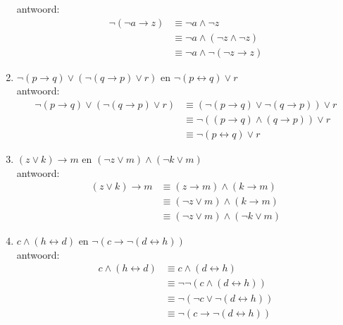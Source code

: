\begin{answer}
\begin{enumerate}[label=\textit{\alph*.}]
antwoord:
\begin{align}
\neg (\neg a\rightarrow z) &\equiv \neg a\wedge \neg z \tag{St-2.3.2: 8} \\
&\equiv \neg a\wedge (\neg z \wedge \neg z) \tag{St-2.3.2: 1}\\
&\equiv \neg a\wedge \neg (\neg z\rightarrow z) \tag{St-2.3.2: 8}
\end{align}
\item $\neg(p\rightarrow q) \lor (\neg (q \rightarrow p) \lor r)$ en $\neg (p\leftrightarrow q) \lor r$\\
antwoord:
\begin{align}
\neg (p \rightarrow q)\vee (\neg (q\rightarrow p)\vee r) &\equiv (\neg (p \rightarrow q)\vee \neg (q\rightarrow p))\vee r \tag{St-2.3.2: 5} \\
&\equiv \neg ((p\rightarrow q) \land (q\rightarrow p)) \vee r \tag{St-2.3.2:10}\\
&\equiv \neg (p \leftrightarrow q) \vee r \tag{St-2.3.2: 4}
\end{align}
\item $(z\lor k)\rightarrow m$ en $(\neg z \lor m) \land (\neg k \lor m)$\\
antwoord:
\begin{align}
(z\vee k)\rightarrow m &\equiv (z\rightarrow m)\wedge (k\rightarrow m) \tag{St-2.3.2:13} \\
&\equiv (\neg z\vee m)\wedge (k\rightarrow m) \tag{St-2.3.2: 7}\\
&\equiv (\neg z\vee m)\wedge (\neg k\vee m) \tag{St-2.3.2: 7}
\end{align}
\item $c \land (h\leftrightarrow d)$ en $\neg (c \rightarrow \neg (d \leftrightarrow h))$  \\
antwoord:
\begin{align}
c \wedge (h\leftrightarrow d) &\equiv c \wedge (d\leftrightarrow h) \tag{St-2.3.2: 4} \\
&\equiv \neg \neg (c \wedge (d\leftrightarrow h)) \tag{St-2.3.2: 1} \\
&\equiv \neg (\neg c \vee \neg (d\leftrightarrow h)) \tag{St-2.3.2:10}\\
&\equiv \neg (c \rightarrow \neg (d\leftrightarrow h)) \tag{St-2.3.2: 7} 
\end{align}

\end{enumerate}
\end{answer}


